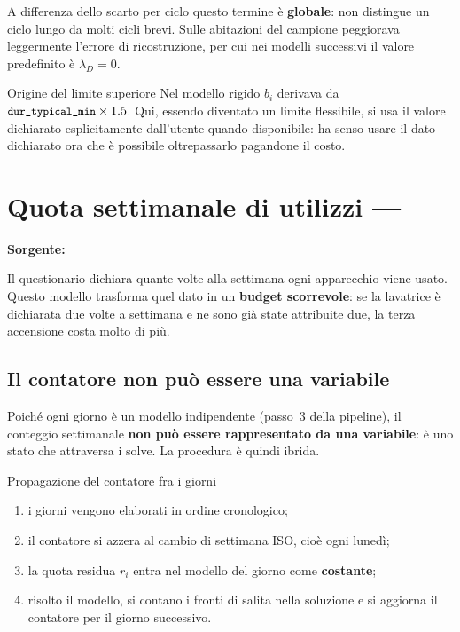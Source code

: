 A differenza dello scarto per ciclo questo termine è \textbf{globale}: non distingue un ciclo
lungo da molti cicli brevi. Sulle abitazioni del campione peggiorava leggermente l'errore di
ricostruzione, per cui nei modelli successivi il valore predefinito è $\lambda_D = 0$.

\begin{notebox}{Origine del limite superiore}
Nel modello rigido $b_i$ derivava da $\texttt{\small dur\_typical\_min} \times 1.5$. Qui, essendo diventato
un limite flessibile, si usa il valore  dichiarato esplicitamente
dall'utente quando disponibile: ha senso usare il dato dichiarato ora che è possibile
oltrepassarlo pagandone il costo.
\end{notebox}

\section{Quota settimanale di utilizzi --- }
\label{sec:m5}

\noindent\textbf{Sorgente:} 

Il questionario dichiara quante volte alla settimana ogni apparecchio viene usato. Questo modello
trasforma quel dato in un \textbf{budget scorrevole}: se la lavatrice è dichiarata due volte a
settimana e ne sono già state attribuite due, la terza accensione costa molto di più.

\subsection*{Il contatore non può essere una variabile}

Poiché ogni giorno è un modello indipendente (passo~3 della pipeline), il conteggio settimanale
\textbf{non può essere rappresentato da una variabile}: è uno stato che attraversa i solve.
La procedura è quindi ibrida.

\begin{modelbox}{Propagazione del contatore fra i giorni}
\begin{enumerate}[nosep,leftmargin=1.6em]
  \item i giorni vengono elaborati in ordine cronologico;
  \item il contatore si azzera al cambio di settimana ISO, cioè ogni lunedì;
  \item la quota residua $r_i$ entra nel modello del giorno come \textbf{costante};
  \item risolto il modello, si contano i fronti di salita nella soluzione e si aggiorna il
        contatore per il giorno successivo.
\end{enumerate}
\end{modelbox}

